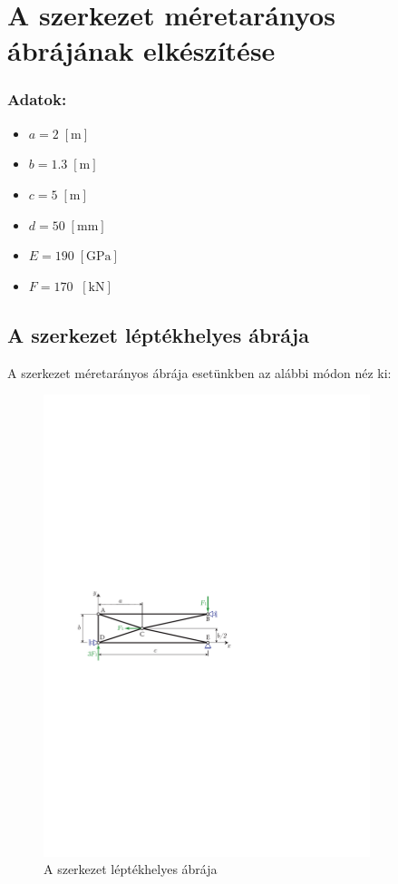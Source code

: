 \documentclass[12pt,a4paper]{article}
\def\m{\; \left[\mathrm{m}\right]}
\def\kN{\; \left[\mathrm{kN}\right]}
\begin{document}
\section{A szerkezet méretarányos ábrájának elkészítése}
\subsubsection*{Adatok:}
\begin{multicols}{2}
    \begin{itemize}
        \item $a=2 \m$
        \item $b=1.3 \m$
        \item $c=5 \m$
    \end{itemize}
    \columnbreak
    \begin{itemize}
        \item $d=50 \; \left[\mathrm{mm}\right]$
        \item $E=190 \; \left[\mathrm{GPa}\right]$
        \item $F=170 \; \kN$
    \end{itemize}
\end{multicols}
\subsection{A szerkezet léptékhelyes ábrája}
A szerkezet méretarányos ábrája esetünkben az alábbi módon néz ki:
\begin{figure}[H]
    \centering
    \includegraphics[width=0.85\textwidth]{vszhf1_abra.pdf}
    \caption{A szerkezet léptékhelyes ábrája}
\end{figure}
\end{document}
